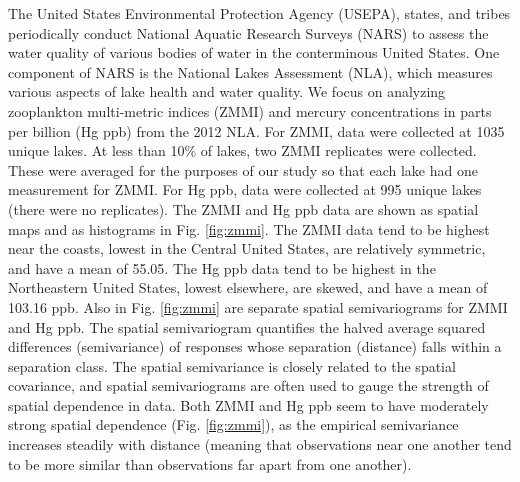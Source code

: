 \documentclass[]{elsarticle} %
\begin{document}
The United States Environmental Protection Agency (USEPA), states, and
tribes periodically conduct National Aquatic Research Surveys (NARS) to
assess the water quality of various bodies of water in the conterminous
United States. One component of NARS is the National Lakes Assessment
(NLA), which measures various aspects of lake health and water quality.
We focus on analyzing zooplankton multi-metric indices (ZMMI) and
mercury concentrations in parts per billion (Hg ppb) from the 2012 NLA.
For ZMMI, data were collected at 1035 unique lakes. At less than 10\% of
lakes, two ZMMI replicates were collected. These were averaged for the
purposes of our study so that each lake had one measurement for ZMMI.
For Hg ppb, data were collected at 995 unique lakes (there were no
replicates). The ZMMI and Hg ppb data are shown as spatial maps and as
histograms in Fig. \ref{fig:zmmi}. The ZMMI data tend to be highest near
the coasts, lowest in the Central United States, are relatively
symmetric, and have a mean of 55.05. The Hg ppb data tend to be highest
in the Northeastern United States, lowest elsewhere, are skewed, and
have a mean of 103.16 ppb. Also in Fig. \ref{fig:zmmi} are separate
spatial semivariograms for ZMMI and Hg ppb. The spatial semivariogram
quantifies the halved average squared differences (semivariance) of
responses whose separation (distance) falls within a separation class.
The spatial semivariance is closely related to the spatial covariance,
and spatial semivariograms are often used to gauge the strength of
spatial dependence in data. Both ZMMI and Hg ppb seem to have moderately
strong spatial dependence (Fig. \ref{fig:zmmi}), as the empirical
semivariance increases steadily with distance (meaning that observations
near one another tend to be more similar than observations far apart
from one another).
\end{document}
